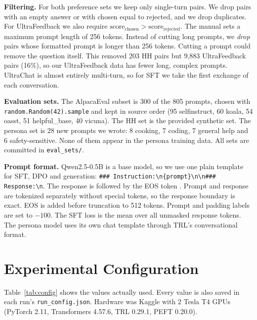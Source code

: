 \documentclass[10pt]{article}
\newcommand{\code}[1]{\texttt{\small #1}}
\begin{document}
\textbf{Filtering.} For both preference sets we keep only single-turn pairs. We drop pairs with an empty answer or
with chosen equal to rejected, and we drop duplicates. For UltraFeedback we also require
$\text{score}_{\text{chosen}} > \text{score}_{\text{rejected}}$. The manual sets a maximum prompt length of 256 tokens.
Instead of cutting long prompts, we \emph{drop} pairs whose formatted prompt is longer than 256 tokens. Cutting a
prompt could remove the question itself. This removed 203 HH pairs but 9,883 UltraFeedback pairs (16\%), so our
UltraFeedback data has fewer long, complex prompts. UltraChat is almost entirely multi-turn, so for SFT we take the
first exchange of each conversation.

\textbf{Evaluation sets.} The AlpacaEval subset \cite{li2023alpacaeval} is 300 of the 805 prompts, chosen with
\code{random.Random(42).sample} and kept in source order (95 selfinstruct, 60 koala, 54 oasst, 51 helpful\_base,
40 vicuna). The HH set is the provided synthetic set. The persona set is 28 new prompts we wrote: 8 cooking, 7 coding,
7 general help and 6 safety-sensitive. None of them appear in the persona training data. All sets are committed in
\code{eval\_sets/}.

\textbf{Prompt format.} Qwen2.5-0.5B is a base model, so we use one plain template for SFT, DPO and generation:
\code{\#\#\# Instruction:\textbackslash n\{prompt\}\textbackslash n\textbackslash n\#\#\# Response:\textbackslash n}.
The response is followed by the EOS token \code{<|endoftext|>}. Prompt and response are tokenized separately without
special tokens, so the response boundary is exact. EOS is added before truncation to 512 tokens. Prompt and padding
labels are set to $-100$. The SFT loss is the mean over all unmasked response tokens. The persona model uses its own
chat template through TRL's conversational format.

\section{Experimental Configuration}
Table~\ref{tab:config} shows the values actually used. Every value is also saved in each run's
\code{run\_config.json}. Hardware was Kaggle with 2 Tesla T4 GPUs (PyTorch 2.11, Transformers 4.57.6, TRL 0.29.1,
PEFT 0.20.0).
\end{document}

